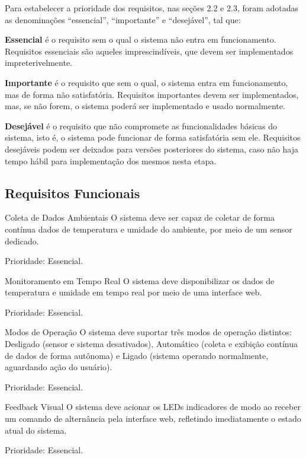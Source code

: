 Para estabelecer a prioridade dos requisitos, nas seções 2.2 e 2.3, foram adotadas as
denominações “essencial”, “importante” e “desejável”, tal que:

\textbf{Essencial} é o requisito sem o qual o sistema não entra em funcionamento. Requisitos
essenciais são aqueles imprescindíveis, que devem ser implementados impreterivelmente.

\textbf{Importante} é o requisito que sem o qual, o sistema entra em funcionamento, mas de forma não
satisfatória. Requisitos importantes devem ser implementados, mas, se não forem, o sistema
poderá ser implementado e usado normalmente.

\textbf{Desejável} é o requisito que não compromete as funcionalidades básicas do sistema, isto é,
o sistema pode funcionar de forma satisfatória sem ele. Requisitos desejáveis podem ser deixados
para versões posteriores do sistema, caso não haja tempo hábil para implementação dos mesmos
nesta etapa.

\subsection{Requisitos Funcionais}

\begin{rfreq}{Coleta de Dados Ambientais}
    O sistema deve ser capaz de coletar de forma contínua dados de temperatura e umidade do ambiente, por meio de um sensor dedicado.
    
    Prioridade: Essencial.
\end{rfreq}

\begin{rfreq}{Monitoramento em Tempo Real}
    O sistema deve disponibilizar os dados de temperatura e umidade em tempo real por meio de uma interface web.
    
    Prioridade: Essencial.
\end{rfreq}

\begin{rfreq}{Modos de Operação}
    O sistema deve suportar três modos de operação distintos: Desligado (sensor e sistema desativados), Automático (coleta e exibição contínua de dados de forma autônoma) e Ligado (sistema operando normalmente, aguardando ação do usuário).
    
    Prioridade: Essencial.
\end{rfreq}

\begin{rfreq}{Feedback Visual}
    O sistema deve acionar os LEDs indicadores de modo ao receber um comando de alternância pela interface web, refletindo imediatamente o estado atual do sistema.
    
    Prioridade: Essencial.
\end{rfreq}

